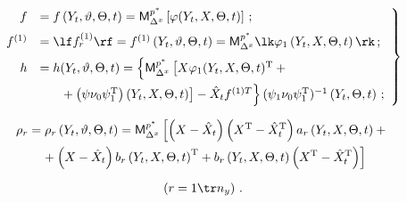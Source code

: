 \begin{equation}

\hspace*{-3mm}\left.

\begin{array}{rl}

    f&= f\left(Y_t,\vartheta,\Theta, t\right)=

    {\sf M}_{\Delta^x}^{p^*} \left[\varphi(Y_t,X,\Theta,t)\right]\,;

\\[6pt]

    f^{(1)}&= \lf f_r^{(1)}\rf= f^{(1)}\left(Y_t,\vartheta,\Theta, t\right)=

    {\sf M}_{\Delta^x}^{p^*}  \lk\varphi_1\left(Y_t,X,\Theta,t\right)\rk\,;

\\[6pt]

    h&= h(Y_t,\vartheta,\Theta,t)=\left\{

    {\sf M}_{\Delta^x}^{p^*} \left[ X\varphi_1(Y_t,X,\Theta,t)^{\mathrm{T}}+{}\right.\right.\\[6pt]

&\left.\left.  \hspace*{5mm}  {}+

\left(\psi\nu_0\psi_1^{\mathrm{T}}\right) \left(Y_t,X,\Theta,t\right)\right]-

    \hat X_t f^{(1)T}\right\} \pss^{-1} \left(Y_t,\Theta,t\right)\,;

\end{array}

   \right\}\!\!

    \label{e4.5-s1}

    \end{equation}

    

    \vspace*{-12pt}

    

    \noindent

    \begin{multline}

    \rho_r= \rho_r\left(Y_t,\vartheta,\Theta,t\right)=

   {\sf M}_{\Delta^x}^{p^*}  \left[ \left(X-\hat X_t\right) 

   \left(X^{\mathrm{T}}-\hat X_t^{\mathrm{T}}\right) a_r\left(Y_t,X,\Theta,t\right)+ {}\right.\\

\left.   {}+

   \left(X-\hat X_t\right) b_r\left(Y_t,X,\Theta,t\right)^{\mathrm{T}}+ 

   b_r\left(Y_t,X,\Theta,t\right)\left(X^{\mathrm{T}}-\hat X_t^{\mathrm{T}}\right)\right]\\[6pt] 

 \left(r=1\tr n_y\right)\,.

    \label{e48b}

    \end{multline}

